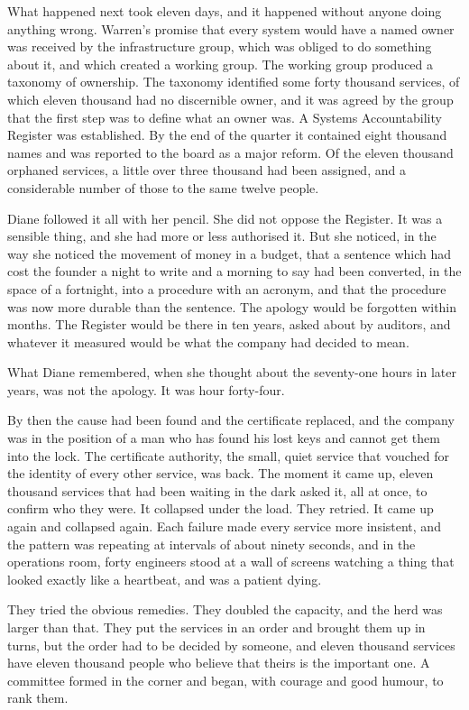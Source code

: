 What happened next took eleven days, and it happened without anyone doing anything wrong. Warren's promise that every system would have a named owner was received by the infrastructure group, which was obliged to do something about it, and which created a working group. The working group produced a taxonomy of ownership. The taxonomy identified some forty thousand services, of which eleven thousand had no discernible owner, and it was agreed by the group that the first step was to define what an owner was. A Systems Accountability Register was established. By the end of the quarter it contained eight thousand names and was reported to the board as a major reform. Of the eleven thousand orphaned services, a little over three thousand had been assigned, and a considerable number of those to the same twelve people.

Diane followed it all with her pencil. She did not oppose the Register. It was a sensible thing, and she had more or less authorised it. But she noticed, in the way she noticed the movement of money in a budget, that a sentence which had cost the founder a night to write and a morning to say had been converted, in the space of a fortnight, into a procedure with an acronym, and that the procedure was now more durable than the sentence. The apology would be forgotten within months. The Register would be there in ten years, asked about by auditors, and whatever it measured would be what the company had decided to mean.

\scenebreak
\noindent What Diane remembered, when she thought about the seventy-one hours in later years, was not the apology. It was hour forty-four.

By then the cause had been found and the certificate replaced, and the company was in the position of a man who has found his lost keys and cannot get them into the lock. The certificate authority, the small, quiet service that vouched for the identity of every other service, was back. The moment it came up, eleven thousand services that had been waiting in the dark asked it, all at once, to confirm who they were. It collapsed under the load. They retried. It came up again and collapsed again. Each failure made every service more insistent, and the pattern was repeating at intervals of about ninety seconds, and in the operations room, forty engineers stood at a wall of screens watching a thing that looked exactly like a heartbeat, and was a patient dying.

They tried the obvious remedies. They doubled the capacity, and the herd was larger than that. They put the services in an order and brought them up in turns, but the order had to be decided by someone, and eleven thousand services have eleven thousand people who believe that theirs is the important one. A committee formed in the corner and began, with courage and good humour, to rank them.

